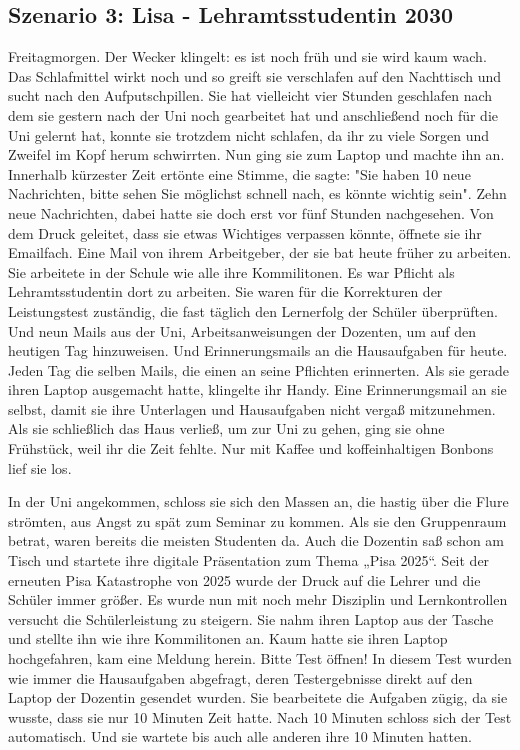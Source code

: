 \documentclass[12pt,a4paper]{article}
\begin{document}
\begin{appendix}
\section{Szenario 3: Lisa - Lehramtsstudentin 2030}
Freitagmorgen. Der Wecker klingelt: es ist noch früh und sie wird kaum wach. Das Schlafmittel wirkt noch und so greift sie verschlafen auf den Nachttisch und sucht nach den Aufputschpillen. Sie hat vielleicht vier Stunden geschlafen nach dem sie gestern nach der Uni noch gearbeitet hat und anschließend noch für die Uni gelernt hat, konnte sie trotzdem nicht schlafen, da ihr zu viele Sorgen und Zweifel im Kopf herum schwirrten. Nun ging sie zum Laptop und machte ihn an. Innerhalb kürzester Zeit ertönte eine Stimme, die sagte: "Sie haben 10 neue Nachrichten, bitte sehen Sie möglichst schnell nach, es könnte wichtig sein". Zehn neue Nachrichten, dabei hatte sie doch erst vor fünf Stunden nachgesehen. Von dem Druck geleitet, dass sie etwas Wichtiges verpassen könnte, öffnete sie ihr Emailfach. Eine Mail von ihrem Arbeitgeber, der sie bat heute früher zu arbeiten. Sie arbeitete in der Schule wie alle ihre Kommilitonen. Es war Pflicht als Lehramtsstudentin dort zu arbeiten. Sie waren für die Korrekturen der Leistungstest zuständig, die fast täglich den Lernerfolg der Schüler überprüften. Und neun Mails aus der Uni, Arbeitsanweisungen der Dozenten, um auf den heutigen Tag hinzuweisen. Und Erinnerungsmails an die Hausaufgaben für heute. Jeden Tag die selben Mails, die einen an seine Pflichten erinnerten. Als sie gerade ihren Laptop ausgemacht hatte, klingelte ihr Handy. Eine Erinnerungsmail an sie selbst, damit sie ihre Unterlagen und Hausaufgaben nicht vergaß mitzunehmen. Als sie schließlich das Haus verließ, um zur Uni zu gehen, ging sie ohne Frühstück, weil ihr die Zeit fehlte. Nur mit Kaffee und koffeinhaltigen Bonbons lief sie los. 

In der Uni angekommen, schloss sie sich den Massen an, die hastig über die Flure strömten, aus Angst zu spät zum Seminar zu kommen. Als sie den Gruppenraum betrat, waren bereits die meisten Studenten da. Auch die Dozentin saß schon am Tisch und startete ihre digitale Präsentation zum Thema „Pisa 2025“. Seit der erneuten Pisa Katastrophe von 2025 wurde der Druck auf die Lehrer und die Schüler immer größer. Es wurde nun mit noch mehr Disziplin und Lernkontrollen versucht die Schülerleistung zu steigern. Sie nahm ihren Laptop aus der Tasche und stellte ihn wie ihre Kommilitonen an. Kaum hatte sie ihren Laptop hochgefahren, kam eine Meldung herein. Bitte Test öffnen! In diesem Test wurden wie immer die Hausaufgaben abgefragt, deren Testergebnisse  direkt auf den Laptop der Dozentin gesendet wurden.  Sie bearbeitete die Aufgaben zügig, da sie wusste, dass sie nur 10 Minuten Zeit hatte. Nach 10 Minuten schloss sich der Test automatisch. Und sie wartete bis auch alle anderen ihre 10 Minuten hatten. 


\end{appendix}
\end{document}
